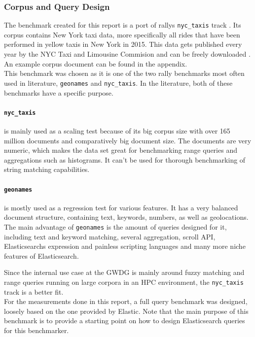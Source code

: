 \subsubsection{Corpus and Query Design}
The benchmark created for this report is a port of rallys \texttt{nyc\_taxis} track \cite{nyctaxis}. Its corpus contains New York taxi data, more specifically all rides that have been performed in yellow taxis in New York in 2015. This data gets published every year by the NYC Taxi and Limousine Commision and can be freely downloaded \cite{tlcdata}. An example corpus document can be found in the appendix.\\

This benchmark was chosen as it is one of the two rally benchmarks most often used in literature, \texttt{geonames} and \texttt{nyc\_taxis}. In the literature, both of these benchmarks have a specific purpose. 

\paragraph{\texttt{nyc\_taxis}} is mainly used as a scaling test because of its big corpus size with over 165 million documents and comparatively big document size. The documents are very numeric, which makes the data set great for benchmarking range queries and aggregations such as histograms. It can't be used for thorough benchmarking of string matching capabilities.

\paragraph{\texttt{geonames}} is mostly used as a regression test for various features. It has a very balanced document structure, containing text, keywords, numbers, as well as geolocations. The main advantage of \texttt{geonames} is the amount of queries designed for it, including text and keyword matching, several aggregation, scroll API, Elasticsearchs expression and painless scripting languages and many more niche features of Elasticsearch.

Since the internal use case at the GWDG is mainly around fuzzy matching and range queries running on large corpora in an \ac{HPC} environment, the \texttt{nyc\_taxis} track is a better fit.\\


For the measurements done in this report, a full query benchmark was designed, loosely based on the one provided by Elastic. Note that the main purpose of this benchmark is to provide a starting point on how to design Elasticsearch queries for this benchmarker. 

